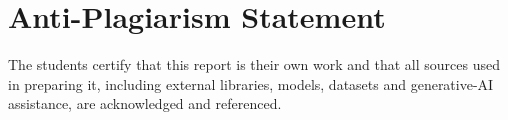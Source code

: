 \chapter*{Anti-Plagiarism Statement}
The students certify that this report is their own work and that all sources used in preparing it, including external libraries, models, datasets and generative-AI assistance, are acknowledged and referenced.
